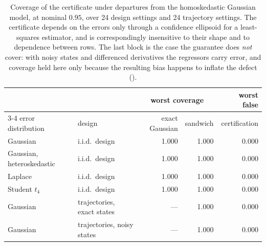\begin{table}[t]
\centering\small
\begin{tabular}{llrrr}
\toprule
& & \multicolumn{2}{c}{worst coverage} & worst false \\
\cmidrule(lr){3-4}
error distribution & design & exact Gaussian & sandwich & certification \\
\midrule
Gaussian & i.i.d.\ design & 1.000 & 1.000 & 0.000 \\
Gaussian, heteroskedastic & i.i.d.\ design & 1.000 & 1.000 & 0.000 \\
Laplace & i.i.d.\ design & 1.000 & 1.000 & 0.000 \\
Student $t_4$ & i.i.d.\ design & 1.000 & 1.000 & 0.000 \\
\midrule
Gaussian & trajectories, exact states & --- & 1.000 & 0.000 \\
Gaussian & trajectories, noisy states & --- & 1.000 & 0.000 \\
\bottomrule
\end{tabular}
\caption{Coverage of the certificate under departures from the homoskedastic
Gaussian model, at nominal $0.95$, over 24 design settings
and 24 trajectory settings. The certificate depends on the errors
only through a confidence ellipsoid for a least-squares estimator, and is
correspondingly insensitive to their shape and to dependence between rows. The
last block is the case the guarantee does \emph{not} cover: with noisy states and
differenced derivatives the regressors carry error, and coverage held here only
because the resulting bias happens to inflate the defect
().}
\label{tab:robustness}
\end{table}
